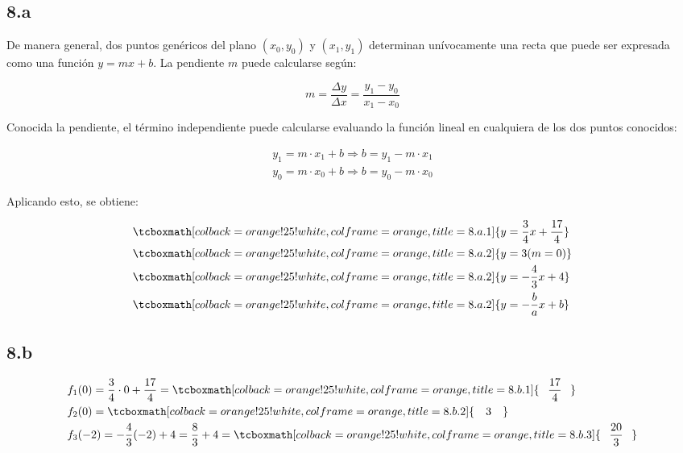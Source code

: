 \documentclass{article}
\newcommand{\hresult}[2]{\tcboxmath[colback=orange!25!white,colframe=orange, title=#1] {#2} }
\newcommand{\hresulte}[3]{\tcboxmath[colback=orange!25!white,colframe=orange, title=#1] { \hspace{#3} #2 \hspace{#3} } }
\begin{document}
\subsection*{8.a}
\label{subsec:8.a}

De manera general, dos puntos genéricos del plano $(x_0, y_0)$ y $(x_1, y_1)$ determinan unívocamente una recta que puede ser expresada como una función $y = m x + b$. La pendiente $m$ puede calcularse según:

\begin{equation}
m = \frac{\Delta y}{\Delta x} = \frac{y_1-y_0}{x_1-x_0}
\end{equation}

Conocida la pendiente, el término independiente puede calcularse evaluando la función lineal en cualquiera de los dos puntos conocidos:

\begin{subequations}
\begin{align}
y_1 = m \cdot x_1 + b \Rightarrow b = y_1 - m \cdot x_1 \\
y_0 = m \cdot x_0 + b \Rightarrow b = y_0 - m \cdot x_0
\end{align}
\end{subequations}

Aplicando esto, se obtiene:

\begin{subequations}
\begin{align}
& \hresult{8.a.1}{ y = \frac{3}{4} x + \frac{17}{4} } \\
& \hresult{8.a.2}{ y = 3 (m = 0) } \\
& \hresult{8.a.2}{ y = -\frac{4}{3} x + 4 }\\
& \hresult{8.a.2}{ y = -\frac{b}{a} x + b }
\end{align}
\end{subequations}

\subsection*{8.b}
\label{subsec:8.b}

\begin{subequations}
\begin{align}
& f_1(0) = \frac{3}{4} \cdot 0 + \frac{17}{4} = \hresulte{8.b.1}{  \frac{17}{4}}{0.75em} \\
& f_2(0) = \hresulte{8.b.2}{ 3 }{1em} \\
& f_3(-2) = -\frac{4}{3} (-2) + 4 = \frac{8}{3} + 4 = \hresulte{8.b.3}{ \frac{20}{3} }{0.75em}
\end{align}
\end{subequations}
\end{document}
